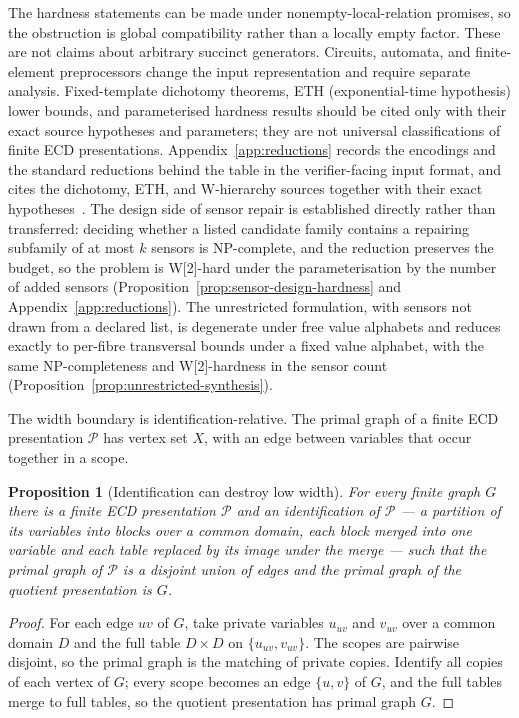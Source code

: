 \documentclass[11pt]{article}
\theoremstyle{plain}
\newtheorem{proposition}[theorem]{Proposition}
\theoremstyle{definition}
\theoremstyle{remark}
\begin{document}
The hardness statements can be made under nonempty-local-relation promises, so
the obstruction is global compatibility rather than a locally empty factor.
These are not claims about arbitrary succinct generators.  Circuits, automata,
and finite-element preprocessors change the input representation and require
separate analysis.  Fixed-template dichotomy theorems, ETH (exponential-time
hypothesis) lower bounds, and parameterised hardness results should be cited only with their exact source
hypotheses and parameters; they are not universal classifications of finite ECD
presentations.  Appendix~\ref{app:reductions} records the encodings and the
standard reductions behind the table in the verifier-facing input format, and
cites the dichotomy, ETH, and W-hierarchy sources together with their exact
hypotheses~\cite{schaefer78,zhuk17,impagliazzo-paturi01,downey-fellows99}.
The design side of sensor repair is established directly rather than
transferred: deciding whether a listed candidate family contains a repairing
subfamily of at most \(k\) sensors is NP-complete, and the reduction
preserves the budget, so the problem is W[2]-hard under the parameterisation
by the number of added sensors (Proposition~\ref{prop:sensor-design-hardness}
and Appendix~\ref{app:reductions}).  The unrestricted formulation, with
sensors not drawn from a declared list, is degenerate under free value
alphabets and reduces exactly to per-fibre transversal bounds under a fixed
value alphabet, with the same NP-completeness and W[2]-hardness in the sensor
count (Proposition~\ref{prop:unrestricted-synthesis}).

The width boundary is identification-relative.  The primal graph of a finite
ECD presentation \(\mathcal P\) has vertex set \(X\), with an edge between
variables that occur together in a scope.

\begin{proposition}[Identification can destroy low width]
\label{prop:identification-width}
For every finite graph \(G\) there is a finite ECD presentation \(\mathcal P\)
and an identification of \(\mathcal P\) --- a partition of its variables into
blocks over a common domain, each block merged into one variable and each
table replaced by its image under the merge --- such that the primal graph of
\(\mathcal P\) is a disjoint union of edges and the primal graph of the
quotient presentation is \(G\).
\end{proposition}

\begin{proof}
For each edge \(uv\) of \(G\), take private variables \(u_{uv}\) and
\(v_{uv}\) over a common domain \(D\) and the full table \(D\times D\) on
\(\{u_{uv},v_{uv}\}\).  The scopes are pairwise disjoint, so the primal
graph is the matching of private copies.  Identify all copies of each vertex
of \(G\); every scope becomes an edge \(\{u,v\}\) of \(G\), and the full
tables merge to full tables, so the quotient presentation has primal graph
\(G\).
\end{proof}
\end{document}
